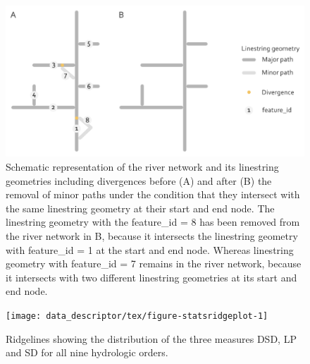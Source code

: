 \documentclass[fleqn,10pt]{wlscirep}
\begin{document}
\begin{figure}[H]

{\centering \includegraphics[width=0.7\linewidth]{data_descriptor/tex/divergences_scheme} 

}

\caption{Schematic representation of the river network and its linestring geometries including divergences before (A) and after (B) the removal of minor paths under the condition that they intersect with the same linestring geometry at their start and end node. The linestring geometry with the feature\_id = 8 has been removed from the river network in B, because it intersects the linestring geometry with feature\_id = 1 at the start and end node. Whereas linestring geometry with feature\_id = 7 remains in the river network, because it intersects with two different linestring geometries at its start and end node.}\label{fig:divergencescheme}
\end{figure}

\normalsize

\small

\begin{figure}[H]

{\centering \texttt{[image: data\_descriptor/tex/figure-statsridgeplot-1]} 

}

\caption{Ridgelines showing the distribution of the three measures DSD, LP and SD for all nine hydrologic orders.}\label{fig:statsridgeplot}
\end{figure}

\normalsize

\small
\end{document}
